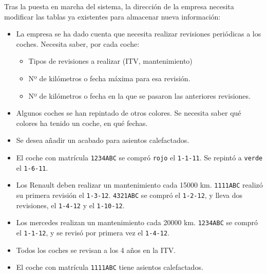 \begin{homeworkProblem}

Tras la puesta en marcha del sistema, la dirección de la empresa necesita modificar las tablas ya existentes para almacenar nueva información:
  
\begin{itemize}
\item La empresa se ha dado cuenta que necesita realizar revisiones
periódicas a los coches. Necesita saber, por cada coche:
\begin{itemize}
\item Tipos de revisiones a realizar (ITV, mantenimiento)
\item Nº de kilómetros o fecha máxima para esa revisión.
\item Nº de kilómetros o fecha en la que se pasaron las anteriores revisiones.
\end{itemize}


\item  Algunos coches se han repintado de otros colores. Se necesita saber qué colores ha tenido un coche, en qué fechas.
\item  Se desea añadir un acabado para asientos calefactados.
\end{itemize}
\end{homeworkProblem}

\begin{homeworkProblem}

  \begin{itemize}
\item  El coche con matrícula \texttt{1234ABC} se compró \texttt{rojo} el \texttt{1-1-11}. Se repintó
a \texttt{verde} el \texttt{1-6-11}.
\item  Los Renault deben realizar un mantenimiento cada 15000 km.
\texttt{1111ABC} realizó su primera revisión el \texttt{1-3-12}. \texttt{4321ABC} se compró el
\texttt{1-2-12}, y lleva dos revisiones, el \texttt{1-4-12} y el \texttt{1-10-12}.
\item  Los mercedes realizan un mantenimiento cada 20000 km. \texttt{1234ABC}
se compró el \texttt{1-1-12}, y se revisó por primera vez el \texttt{1-4-12}.
\item  Todos los coches se revisan a los 4 años en la ITV.
\item  El coche con matrícula \texttt{1111ABC} tiene asientos calefactados.
\end{itemize}
\end{homeworkProblem}

